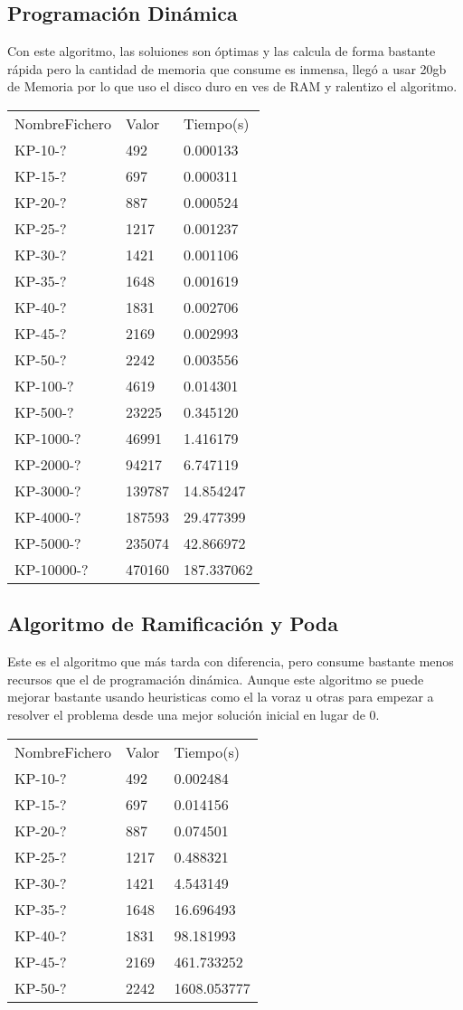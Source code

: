 \documentclass[preprint]{elsarticle}
\begin{document}
\subsection{Programaci\'on Din\'amica}
Con este algoritmo, las soluiones son \'optimas y las calcula de forma bastante r\'apida pero la cantidad de memoria que consume es inmensa, lleg\'o a usar 20gb de Memoria por lo que uso el disco duro en ves de RAM y ralentizo el algoritmo.
\begin{table}[h]
\begin{tabular}{lll}
NombreFichero & Valor & Tiempo(s)\\
KP-10-? & 492 & 0.000133\\
KP-15-? & 697 & 0.000311\\
KP-20-? & 887 & 0.000524\\
KP-25-? & 1217 & 0.001237\\
KP-30-? & 1421 & 0.001106\\
KP-35-? & 1648 & 0.001619\\
KP-40-? & 1831 & 0.002706\\
KP-45-? & 2169 & 0.002993\\
KP-50-? & 2242 & 0.003556\\
KP-100-? & 4619 & 0.014301\\
KP-500-? & 23225 & 0.345120\\ 
KP-1000-? & 46991 & 1.416179\\
KP-2000-? & 94217 & 6.747119\\ 
KP-3000-? & 139787 & 14.854247\\
KP-4000-? & 187593 & 29.477399\\
KP-5000-? & 235074 & 42.866972\\
KP-10000-? & 470160 & 187.337062
\end{tabular}
\end{table}

\subsection{Algoritmo de Ramificaci\'on y Poda}
Este es el algoritmo que m\'as tarda con diferencia, pero consume bastante menos recursos que el de programaci\'on din\'amica. Aunque este algoritmo se puede mejorar bastante usando heuristicas como el la voraz u otras para empezar a resolver el problema desde una mejor soluci\'on inicial en lugar de 0.

\begin{table}[h]
\begin{tabular}{lll}
NombreFichero & Valor & Tiempo(s)\\
KP-10-? & 492 & 0.002484\\
KP-15-? & 697 & 0.014156\\
KP-20-? & 887 & 0.074501\\
KP-25-? & 1217 & 0.488321\\
KP-30-? & 1421 & 4.543149\\
KP-35-? & 1648 & 16.696493\\
KP-40-? & 1831 & 98.181993\\
KP-45-? & 2169 & 461.733252\\
KP-50-? & 2242 & 1608.053777
\end{tabular}
\end{table}
\end{document}
